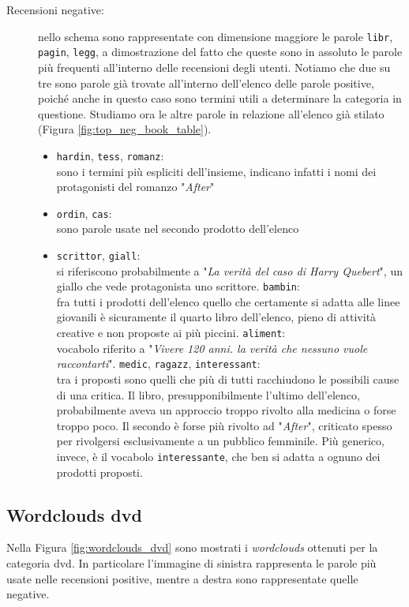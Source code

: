 \begin{description}
				\item[Recensioni negative:] 
				nello schema sono rappresentate con dimensione maggiore le parole \verb|libr|, \verb|pagin|, \verb|legg|, a dimostrazione del fatto che queste sono in assoluto le parole più frequenti all'interno delle recensioni degli utenti. Notiamo che due su tre sono parole già trovate all'interno dell'elenco delle parole positive, poiché anche in questo caso sono termini utili a determinare la categoria in questione. Studiamo ora le altre parole in relazione all'elenco già stilato (Figura \ref{fig:top_neg_book_table}).
				
				\begin{itemize}
					\item \texttt{hardin}, \texttt{tess}, \texttt{romanz}: \\
					sono i termini più espliciti dell'insieme, indicano infatti i nomi dei protagonisti del romanzo "\textit{After}"
					\item \texttt{ordin}, \texttt{cas}:\\
					sono parole usate nel secondo prodotto dell'elenco 
					\item \texttt{scrittor}, \texttt{giall}:\\
					si riferiscono probabilmente a "\textit{La verità del caso di Harry Quebert}", un giallo che vede protagonista uno scrittore.
					\texttt{bambin}: \\
					fra tutti i prodotti dell'elenco quello che certamente si adatta alle linee giovanili è sicuramente il quarto libro dell'elenco, pieno di attività creative e non proposte ai più piccini.
					\texttt{aliment}: \\
					vocabolo riferito a "\textit{Vivere 120 anni. la verità che nessuno vuole raccontarti}".
					\texttt{medic}, \texttt{ragazz}, \texttt{interessant}: \\
					tra i proposti sono quelli che più di tutti racchiudono le possibili cause di una critica. Il libro, presupponibilmente l'ultimo dell'elenco, probabilmente aveva un approccio troppo rivolto alla medicina o forse troppo poco. Il secondo è forse più rivolto ad "\textit{After}", criticato spesso per rivolgersi esclusivamente a un pubblico femminile. Più generico, invece, è il vocabolo \verb|interessante|, che ben si adatta a ognuno dei prodotti proposti.												
				\end{itemize}
			\end{description}
		
		
		\subsection{Wordclouds dvd}
			Nella Figura \ref{fig:wordclouds_dvd} sono mostrati i \textit{wordclouds} ottenuti per la categoria dvd. In particolare l'immagine di sinistra rappresenta le parole più usate nelle recensioni positive, mentre a destra sono rappresentate quelle negative. 
				
